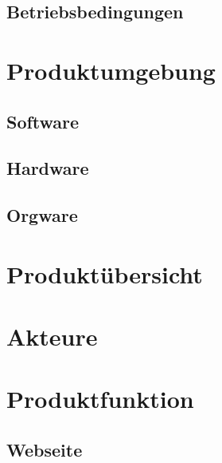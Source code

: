 \documentclass[10pt,a4paper]{article}
\begin{document}
\subsection{Betriebsbedingungen}

\section{Produktumgebung}
\subsection{Software}
\subsection{Hardware}
\subsection{Orgware}

\section{Produkt\"ubersicht}

\section{Akteure}

\section{Produktfunktion}
\subsection{Webseite}
\end{document}
